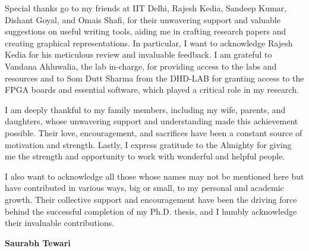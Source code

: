 Special thanks go to my friends at IIT Delhi, Rajesh Kedia, Sandeep Kumar, Dishant Goyal, and Omais Shafi, for their unwavering support and valuable suggestions on useful writing tools, aiding me in crafting research papers and creating graphical representations. In particular, I want to acknowledge Rajesh Kedia for his meticulous review and invaluable feedback. I am grateful to Vandana Ahluwalia, the lab in-charge, for providing access to the labs and resources and to Som Dutt Sharma from the DHD-LAB for granting access to the FPGA boards and essential software, which played a critical role in my research.

I am deeply thankful to my family members, including my wife, parents, and daughters, whose unwavering support and understanding made this achievement possible. Their love, encouragement, and sacrifices have been a constant source of motivation and strength. Lastly, I express gratitude to the Almighty for giving me the strength and opportunity to work with wonderful and helpful people.

I also want to acknowledge all those whose names may not be mentioned here but have contributed in various ways, big or small, to my personal and academic growth. Their collective support and encouragement have been the driving force behind the successful completion of my Ph.D. thesis, and I humbly acknowledge their invaluable contributions.
\vspace{0.9cm}
{ \begin{flushright}{\bf Saurabh Tewari}\end{flushright} }

